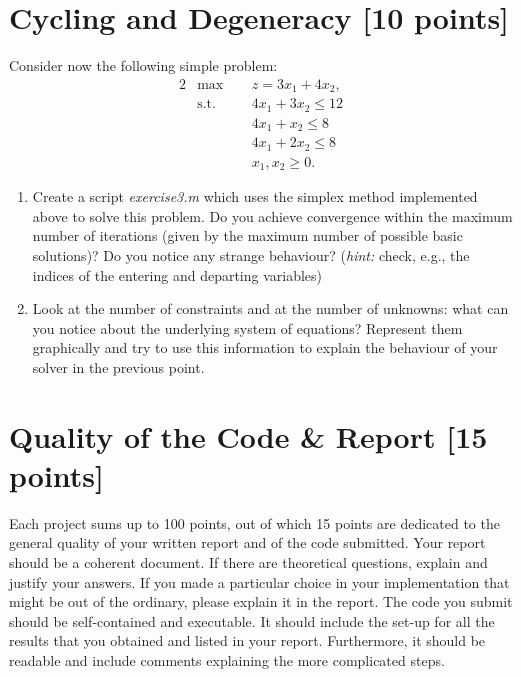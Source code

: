 \documentclass[unicode,11pt,a4paper,oneside,numbers=endperiod,openany]{scrartcl}
\begin{document}
\section{Cycling and Degeneracy [10 points]}

Consider now the following simple problem:
\begin{alignat*}{2}
	&\text{max}\;\, && z = 3x_1+4x_2,\\
	&\text{s.t.} && 4x_1+3x_2\leq 12\\
	& && 4x_1+x_2\leq 8\\
	& && 4x_1+2x_2\leq 8\\
	& && x_1, x_2 \geq 0.
\end{alignat*}

\begin{enumerate}
	\item Create a script \emph{exercise3.m} which uses the simplex method implemented above to solve this problem. Do you achieve convergence within the maximum number of iterations (given by the maximum number of possible basic solutions)? Do you notice any strange behaviour? (\emph{hint:} check, e.g., the indices of the entering and departing variables)
	\item Look at the number of constraints and at the number of unknowns: what can you notice about the underlying system of equations? Represent them graphically and try to use this information to explain the behaviour of your solver in the previous point. 
\end{enumerate}

\section{Quality of the Code \& Report [15 points]}

Each project sums up to 100 points, out of which 15 points are dedicated to the general quality of your written report and of the code submitted. Your report should be a coherent document. If there are theoretical questions, explain and justify your answers. If you made a particular choice in your implementation that might be out of the ordinary, please explain it in the report. The code you submit should be self-contained and executable. It should include the set-up for all the results that you obtained and listed in your report. Furthermore, it should be readable and include comments explaining the more complicated steps.
\end{document}

